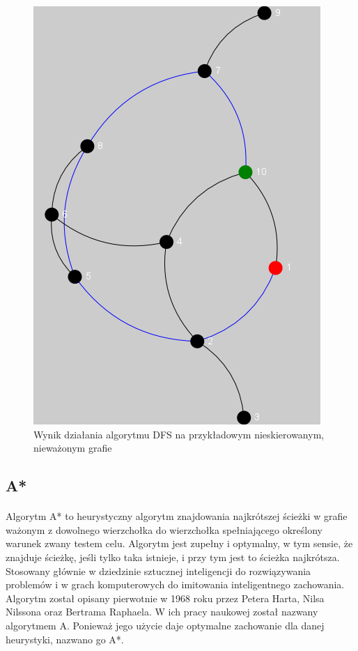\begin{figure}[!h]
 \centering
 \includegraphics{algorithms/dfs}
 \caption{Wynik działania algorytmu DFS na przykładowym nieskierowanym, nieważonym grafie}
 \label{fig:dfs}
\end{figure}

\subsection{A*}
\paragraph{}
Algorytm A* to heurystyczny algorytm znajdowania najkrótszej ścieżki w grafie ważonym z dowolnego wierzchołka do wierzchołka spełniającego określony
warunek zwany testem celu. 
Algorytm jest zupełny i optymalny, w tym sensie, że znajduje ścieżkę, jeśli tylko taka istnieje, i przy tym jest to ścieżka najkrótsza. 
Stosowany głównie w dziedzinie sztucznej inteligencji do rozwiązywania problemów i w grach komputerowych do imitowania inteligentnego zachowania.
Algorytm został opisany pierwotnie w 1968 roku przez Petera Harta, Nilsa Nilssona oraz Bertrama Raphaela. 
W ich pracy naukowej został nazwany algorytmem A. 
Ponieważ jego użycie daje optymalne zachowanie dla danej heurystyki, nazwano go A*.

